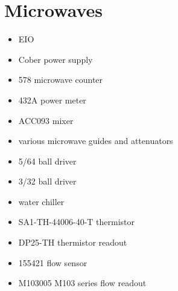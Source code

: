 \section{Microwaves}
\begin{itemize}
 \item EIO
\item Cober power supply
\item {} 578 microwave counter
\item {} 432A power meter
\item {} ACC093 mixer
\item various microwave guides and attenuators
\item 5/64\inches{} ball driver
\item 3/32\inches{} ball driver
\item water chiller
\item {} SA1-TH-44006-40-T thermistor
\item {} DP25-TH thermistor readout
\item {} 155421 flow sensor
\item {} M103005  M103 series flow readout
\end{itemize}
